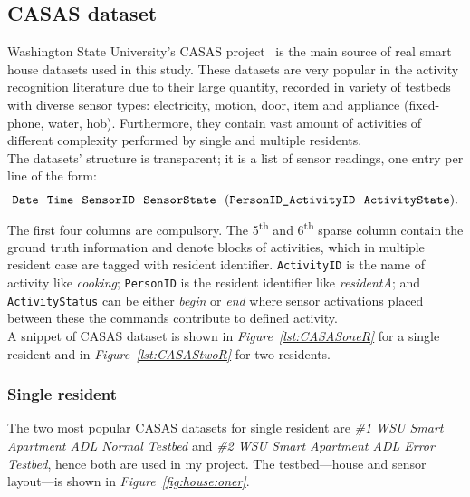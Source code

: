 \documentclass[10pt, a4paper, pdflatex, leqno, twoside, openright]{report}
\newcommand{\ts}{\textsuperscript}
\begin{document}
    \subsection{CASAS dataset\label{sec:csasDataDet}}
Washington State University's CASAS project~\citep{cook2009assessing} is the main source of real smart house datasets used in this study. These datasets are very popular in the activity recognition literature due to their large quantity, recorded in variety of testbeds with diverse sensor types: electricity, motion, door, item and appliance (fixed-phone, water, hob). Furthermore, they contain vast amount of activities of different complexity performed by single and multiple residents.\\
The datasets' structure is transparent; it is a list of sensor readings, one entry per line of the form:
$$
\text{\texttt{Date}~~\texttt{Time}~~\texttt{SensorID}~~\texttt{SensorState}~~(\texttt{PersonID\_ActivityID}~~\texttt{ActivityState}).}
$$
The first four columns are compulsory. The 5\ts{th} and 6\ts{th} sparse column contain the ground truth information and denote blocks of activities, which in multiple resident case are tagged with resident identifier. \texttt{ActivityID} is the name of activity like \emph{cooking}; \texttt{PersonID} is the resident identifier like \emph{residentA}; and \texttt{ActivityStatus} can be either \emph{begin} or \emph{end} where sensor activations placed between these the commands contribute to defined activity.\\
A snippet of CASAS dataset is shown in \emph{Figure~\ref{lst:CASASoneR}} for a single resident and in \emph{Figure~\ref{lst:CASAStwoR}} for two residents.

      \subsubsection{Single resident}
The two most popular CASAS datasets for single resident are \emph{\#1 WSU Smart Apartment ADL Normal Testbed} and \emph{\#2 WSU Smart Apartment ADL Error Testbed}, hence both are used in my project. The testbed---house and sensor layout---is shown in \emph{Figure~\ref{fig:house:oner}}.\\
\end{document}
